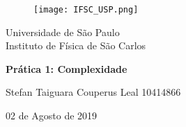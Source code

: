 \documentclass[a4paper, 12pt]{article}
\begin{document}

\begin{titlepage}

\begin{figure}[H]
\centering
\texttt{[image: IFSC\_USP.png]} %

\end{figure}
    \begin{center}
        Universidade de São Paulo \\

        Instituto de Física de São Carlos \\


\vspace{10pt}


        \vspace{85pt}


         \large\textbf{{Prática 1: Complexidade}} %
        \vspace{160pt}

    \end{center}

    \begin{flushright}

        Stefan Taiguara Couperus Leal 10414866
    \end{flushright}

    \begin{center}
        \vspace{\fill}
        02 de Agosto de 2019 %
    \end{center}
\end{titlepage}

\newpage

\tableofcontents    %



\thispagestyle{empty}

\newpage
{}


\justifying
\end{document}
